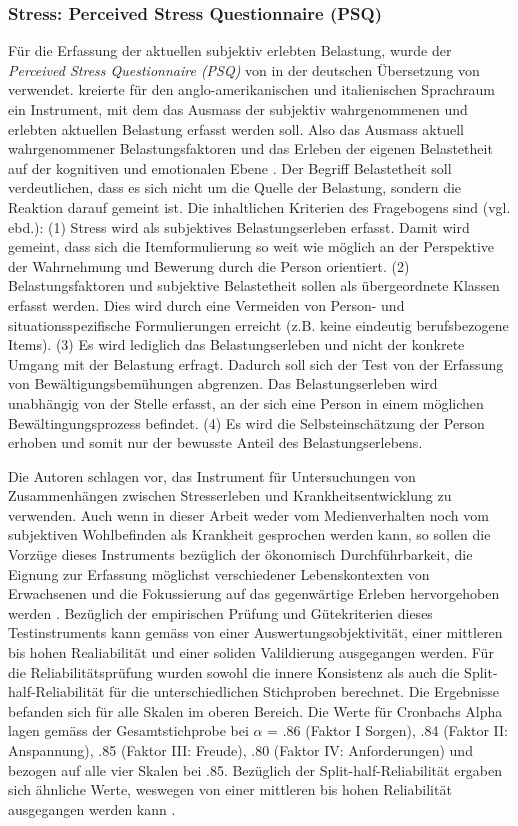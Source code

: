 \subsubsection{Stress: Perceived Stress Questionnaire (PSQ)}\label{sec:PSQ}
Für die Erfassung der aktuellen subjektiv erlebten Belastung, wurde der \textit{Perceived Stress Questionnaire (PSQ)} von  in der deutschen Übersetzung von  verwendet.
 kreierte für den anglo-amerikanischen und italienischen Sprachraum ein Instrument, mit dem das Ausmass der subjektiv wahrgenommenen und erlebten aktuellen Belastung erfasst werden soll. Also das Ausmass aktuell wahrgenommener Belastungsfaktoren und das Erleben der eigenen Belastetheit auf der kognitiven und emotionalen Ebene \cite{Fliege2001}. Der Begriff Belastetheit soll verdeutlichen, dass es sich nicht um die Quelle der Belastung, sondern die Reaktion darauf gemeint ist. Die inhaltlichen Kriterien des Fragebogens sind (vgl. ebd.): (1) Stress wird als subjektives Belastungserleben erfasst. Damit wird gemeint, dass sich die Itemformulierung so weit wie möglich an der Perspektive der Wahrnehmung und Bewerung durch die Person orientiert. (2) Belastungsfaktoren und subjektive Belastetheit sollen als übergeordnete Klassen erfasst werden. Dies wird durch eine Vermeiden von Person- und situationsspezifische Formulierungen erreicht (z.B. keine eindeutig berufsbezogene Items). (3) Es wird lediglich das Belastungserleben und nicht der konkrete Umgang mit der Belastung erfragt. Dadurch soll sich der Test von der Erfassung von Bewältigungsbemühungen abgrenzen. Das Belastungserleben wird unabhängig von der Stelle erfasst, an der sich eine Person in einem möglichen Bewältingungsprozess befindet. (4) Es wird die Selbsteinschätzung der Person erhoben und somit nur der bewusste Anteil des Belastungserlebens.

Die Autoren  schlagen vor, das Instrument für Untersuchungen von Zusammenhängen zwischen Stresserleben und Krankheitsentwicklung zu verwenden. Auch wenn in dieser Arbeit weder vom Medienverhalten noch vom subjektiven Wohlbefinden als Krankheit gesprochen werden kann, so sollen die Vorzüge dieses Instruments bezüglich der ökonomisch Durchführbarkeit, die Eignung zur Erfassung möglichst verschiedener Lebenskontexten von Erwachsenen und die Fokussierung auf das gegenwärtige Erleben hervorgehoben werden \cite{Fliege2001}. Bezüglich der empirischen Prüfung und Gütekriterien dieses Testinstruments kann gemäss  von einer Auswertungsobjektivität, einer mittleren bis hohen Realiabilität und einer soliden Valildierung ausgegangen werden. 
Für die Reliabilitätsprüfung wurden sowohl die innere Konsistenz als auch die Split-half-Reliabilität für die unterschiedlichen Stichproben berechnet. Die Ergebnisse befanden sich für alle Skalen im oberen Bereich. Die Werte für Cronbachs Alpha lagen gemäss \cite{Fliege2001} der Gesamtstichprobe bei $\alpha$ = .86 (Faktor I Sorgen), .84 (Faktor II: Anspannung), .85 (Faktor III: Freude), .80 (Faktor IV: Anforderungen) und bezogen auf alle vier Skalen bei .85. Bezüglich der Split-half-Reliabilität ergaben sich ähnliche Werte, weswegen von einer mittleren bis hohen Reliabilität ausgegangen werden kann \cite{Fliege2001}.

